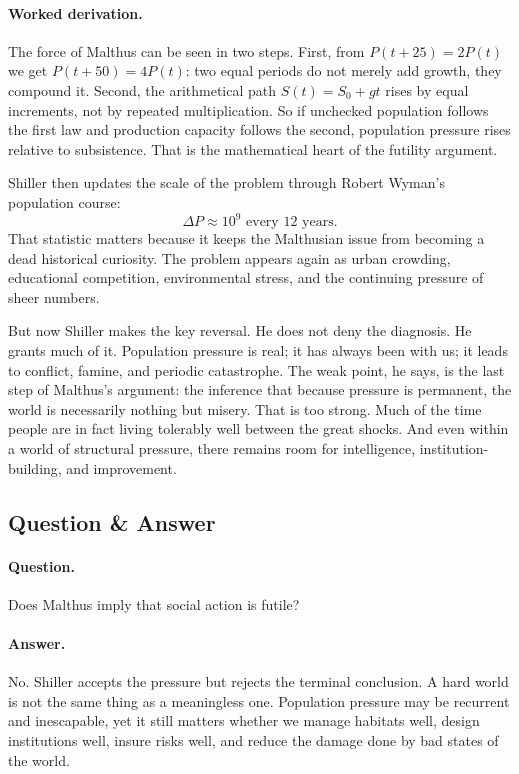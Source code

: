 \paragraph{Worked derivation.} The force of Malthus can be seen in two steps. First, from \(P(t+25)=2P(t)\) we get \(P(t+50)=4P(t)\): two equal periods do not merely add growth, they compound it. Second, the arithmetical path \(S(t)=S_0+gt\) rises by equal increments, not by repeated multiplication. So if unchecked population follows the first law and production capacity follows the second, population pressure rises relative to subsistence. That is the mathematical heart of the futility argument.

Shiller then updates the scale of the problem through Robert Wyman's population course:
\begin{equation}
\Delta P \approx 10^9 \text{ every 12 years.}
\end{equation}
That statistic matters because it keeps the Malthusian issue from becoming a dead historical curiosity. The problem appears again as urban crowding, educational competition, environmental stress, and the continuing pressure of sheer numbers.

But now Shiller makes the key reversal. He does not deny the diagnosis. He grants much of it. Population pressure is real; it has always been with us; it leads to conflict, famine, and periodic catastrophe. The weak point, he says, is the last step of Malthus's argument: the inference that because pressure is permanent, the world is necessarily nothing but misery. That is too strong. Much of the time people are in fact living tolerably well between the great shocks. And even within a world of structural pressure, there remains room for intelligence, institution-building, and improvement.

\subsection{Question \& Answer}

\paragraph{Question.} Does Malthus imply that social action is futile?

\paragraph{Answer.} No. Shiller accepts the pressure but rejects the terminal conclusion. A hard world is not the same thing as a meaningless one. Population pressure may be recurrent and inescapable, yet it still matters whether we manage habitats well, design institutions well, insure risks well, and reduce the damage done by bad states of the world.


